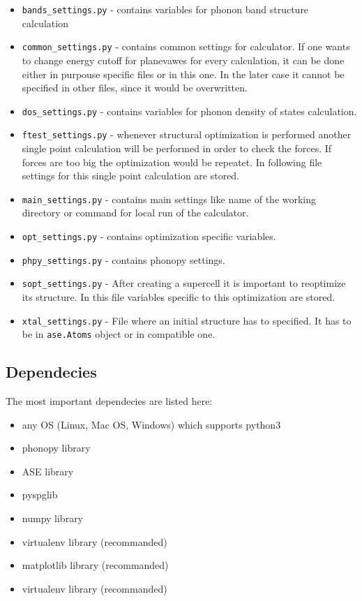 \documentclass[12pt]{article}
\begin{document}
\begin{itemize}
  \item \texttt{bands\_settings.py} - contains variables for phonon band structure calculation
  \item \texttt{common\_settings.py} - contains common settings for calculator. If one wants to change energy cutoff for planevawes for every calculation, it can be done either in purpouse specific files or in this one. In the later case it cannot be specified in other files, since it would be overwritten.
  \item \texttt{dos\_settings.py} - contains variables for phonon density of states calculation.
  \item \texttt{ftest\_settings.py} - whenever structural optimization is performed another single point calculation will be performed in order to check the forces. If forces are too big the optimization would be repeatet. In following file settings for this single point calculation are stored.
  \item \texttt{main\_settings.py} - contains main settings like name of the working directory or command for local run of the calculator.
  \item \texttt{opt\_settings.py} - contains optimization specific variables.
  \item \texttt{phpy\_settings.py} - contains phonopy settings.
  \item \texttt{sopt\_settings.py} - After creating a supercell it is important to reoptimize its structure. In this file variables specific to this optimization are stored.
  \item \texttt{xtal\_settings.py} - File where an initial structure has to specified. It has to be in \texttt{ase.Atoms} object or in compatible one.
\end{itemize}

\subsection{Dependecies}\label{deps}

The most important dependecies are listed here:

\begin{itemize}
  \item any OS (Linux, Mac OS, Windows) which supports python3
  \item phonopy library
  \item ASE library
  \item pyspglib
  \item numpy library
  \item virtualenv library (recommanded)
  \item matplotlib library (recommanded)
  \item virtualenv library (recommanded)
\end{itemize}
\end{document}
